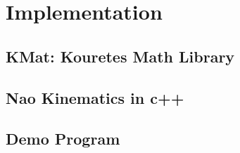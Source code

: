 \chapter{Implementation}
\label{Implementation}
\section{KMat: Kouretes Math Library}
\section{Nao Kinematics in c++}
\section{Demo Program}

